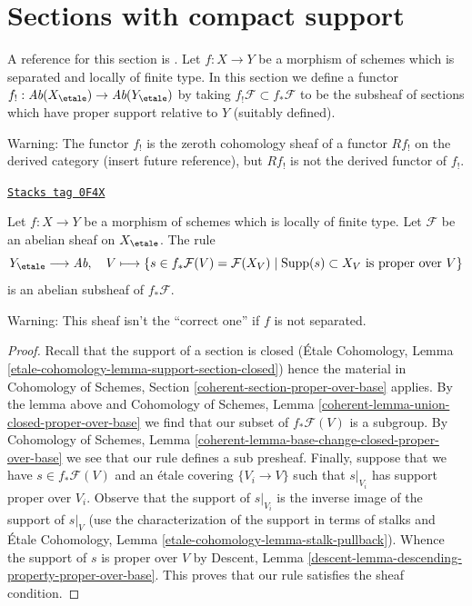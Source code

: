 \section{Sections with compact support}
\label{more-etale-section-compact-support}
A reference for this section is \cite[Exposee XVII, Section 6]{SGA4}.
Let $f : X \to Y$ be a morphism of schemes which is separated and
locally of finite type. In this section we define a functor
$f_! : \textit{Ab}(X_\etale) \to \textit{Ab}(Y_\etale)$
by taking $f_!\mathcal{F} \subset f_*\mathcal{F}$
to be the subsheaf of sections which have proper support relative to $Y$
(suitably defined).

\medskip\noindent
Warning: The functor $f_!$ is the zeroth cohomology sheaf of a functor
$Rf_!$ on the derived category (insert future reference), but
$Rf_!$ is not the derived functor of $f_!$.

\begin{lemma}
\label{more-etale-lemma-f-shriek-separated}
\href{https://stacks.math.columbia.edu/tag/0F4X}{\texttt{Stacks tag 0F4X}}

Let $f : X \to Y$ be a morphism of schemes which is locally of finite type.
Let $\mathcal{F}$ be an abelian sheaf on $X_\etale$. The rule
$$
Y_\etale \longrightarrow \textit{Ab},\quad
V \longmapsto \{s \in f_*\mathcal{F}(V) = \mathcal{F}(X_V) \mid
\text{Supp}(s) \subset X_V \text{ is proper over }V\}
$$
is an abelian subsheaf of $f_*\mathcal{F}$.
\end{lemma}

Warning: This sheaf isn't the ``correct one'' if $f$ is not separated.

\begin{proof}
Recall that the support of a section is closed
(\'Etale Cohomology, Lemma \ref{etale-cohomology-lemma-support-section-closed})
hence the material in
Cohomology of Schemes, Section \ref{coherent-section-proper-over-base}
applies. By the lemma above and
Cohomology of Schemes, Lemma \ref{coherent-lemma-union-closed-proper-over-base}
we find that our subset of $f_*\mathcal{F}(V)$ is a subgroup.
By Cohomology of Schemes, Lemma
\ref{coherent-lemma-base-change-closed-proper-over-base}
we see that our rule defines a sub presheaf.
Finally, suppose that we have $s \in f_*\mathcal{F}(V)$
and an \'etale covering $\{V_i \to V\}$ such that
$s|_{V_i}$ has support proper over $V_i$.
Observe that the support of $s|_{V_i}$ is the inverse
image of the support of $s|_V$ (use the characterization
of the support in terms of stalks and
\'Etale Cohomology, Lemma \ref{etale-cohomology-lemma-stalk-pullback}).
Whence the support of $s$ is proper over $V$ by
Descent, Lemma \ref{descent-lemma-descending-property-proper-over-base}.
This proves that our rule satisfies the sheaf condition.
\end{proof}

